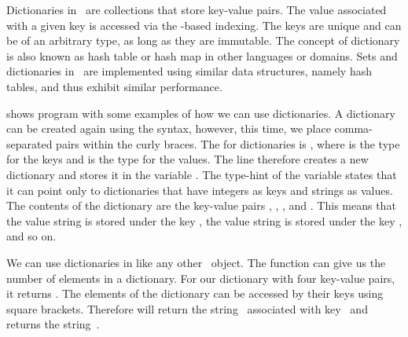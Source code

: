 %
\label{sec:dictionaries}%
%
%
%
%
Dictionaries in \python\ are collections that store key-value pairs.
The value associated with a given key is accessed via the \pythonil{[...]}\pythonIdx{[\idxdots]}-based indexing.
The keys are unique and can be of an arbitrary type, as long as they are immutable.
The concept of dictionary is also known as hash table or hash map in other languages or domains.
Sets and dictionaries in \python\ are implemented using similar data structures, namely hash tables, and thus exhibit similar performance.%
%
\begin{sloppypar}%
 shows program  with some examples of how we can use dictionaries.
A dictionary can be created again using the  syntax, however, this time, we place comma-separated  pairs within the curly braces.
The  for dictionaries is , where  is the type for the keys and  is the type for the values.
The line  therefore creates a new dictionary and stores it in the variable .
The type-hint of the variable states that it can point only to dictionaries that have integers as keys and strings as values.
The contents of the dictionary are the key-value pairs , , , and .
This means that the value string  is stored under the key , the value string  is stored under the key , and so on.%
\end{sloppypar}%
%
We can use dictionaries in  like any other \python\ object.
The function  can give us the number of elements in a dictionary.
For our dictionary  with four key-value pairs, it returns .
The elements of the dictionary can be accessed by their keys using square brackets.
Therefore  will return the string~ associated with key~ and  returns the string~.%
%
